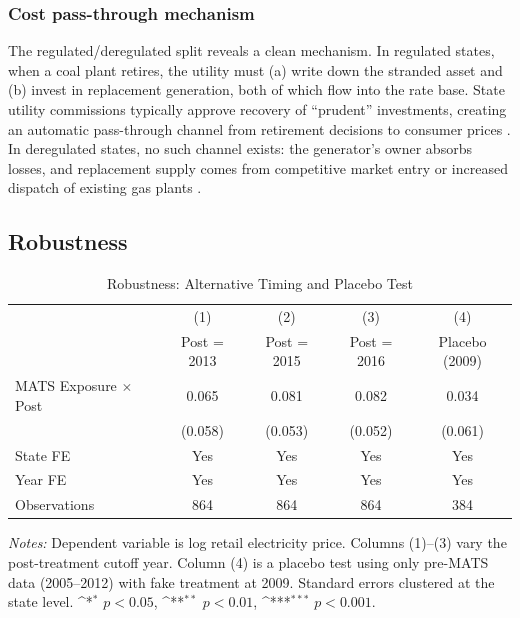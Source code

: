 \documentclass[12pt]{article}
\newcommand{\sym}[1]{\ifmmode^{#1}\else\(^{#1}\)\fi}
\begin{document}
\subsubsection*{Cost pass-through mechanism} The regulated/deregulated split reveals a clean mechanism. In regulated states, when a coal plant retires, the utility must (a) write down the stranded asset and (b) invest in replacement generation, both of which flow into the rate base. State utility commissions typically approve recovery of ``prudent'' investments, creating an automatic pass-through channel from retirement decisions to consumer prices \citep{joskow1998competitive}. In deregulated states, no such channel exists: the generator's owner absorbs losses, and replacement supply comes from competitive market entry or increased dispatch of existing gas plants \citep{fowlie2010emissions, borenstein2012private}.

\subsection{Robustness}

\begin{table}[H]
\centering
\caption{Robustness: Alternative Timing and Placebo Test}
\begin{threeparttable}
\begin{tabular}{lcccc}
\toprule
& (1) & (2) & (3) & (4) \\
& Post = 2013 & Post = 2015 & Post = 2016 & Placebo (2009) \\
\midrule
MATS Exposure $\times$ Post & 0.065 & 0.081 & 0.082 & 0.034 \\
& (0.058) & (0.053) & (0.052) & (0.061) \\
\addlinespace
State FE & Yes & Yes & Yes & Yes \\
Year FE & Yes & Yes & Yes & Yes \\
Observations & 864 & 864 & 864 & 384 \\
\bottomrule
\end{tabular}
\begin{tablenotes}[flushleft]
\small
\item \textit{Notes:} Dependent variable is log retail electricity price. Columns (1)--(3) vary the post-treatment cutoff year. Column (4) is a placebo test using only pre-MATS data (2005--2012) with fake treatment at 2009. Standard errors clustered at the state level. \sym{*} $p<0.05$, \sym{**} $p<0.01$, \sym{***} $p<0.001$.
\end{tablenotes}
\end{threeparttable}
\label{tab:robustness}
\end{table}
\end{document}
